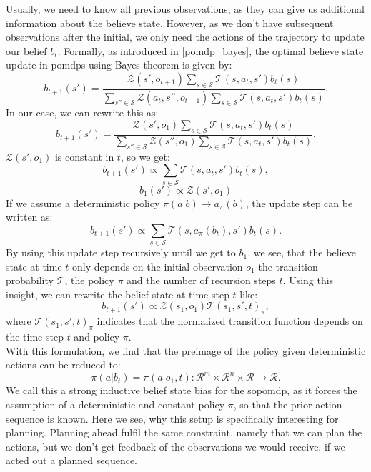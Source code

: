 Usually, 
we need to know all previous observations, as they can give us additional information about the believe state. However, as we don't have subsequent observations 
after the initial, we only need the actions of the trajectory to update our belief $b_t$. Formally, as introduced in \ref{pomdp_bayes}, the optimal believe state 
update in \ac{pomdp}s using Bayes theorem is given by:
\begin{equation}
    b_{t+1}(s') = \frac{\mathcal{Z}(s', o_{t+1}) \sum_{s \in \mathcal{S}} \mathcal{T}(s, a_t, s') b_t(s)}{\sum_{s'' \in \mathcal{S}} \mathcal{Z}(a_t, s'', o_{t+1}) \sum_{s \in \mathcal{S}} \mathcal{T}(s, a_t, s') b_t(s)}.
\end{equation}
In our case, we can rewrite this as:
\begin{equation}
    b_{t+1}(s') = \frac{\mathcal{Z}(s', o_{1}) \sum_{s \in \mathcal{S}} \mathcal{T}(s, a_t, s') b_t(s)}{\sum_{s'' \in \mathcal{S}} \mathcal{Z}(s'', o_{1}) \sum_{s \in \mathcal{S}} \mathcal{T}(s, a_t, s') b_t(s)}.
\end{equation}
$\mathcal{Z}(s', o_{1})$ is constant in $t$, so we get:
\begin{equation*}
    b_{t+1}(s') \propto \sum_{s \in \mathcal{S}} \mathcal{T}(s, a_t, s') b_t(s),
\end{equation*}
\begin{equation}
    b_{1}(s') \propto \mathcal{Z}(s', o_{1})
\end{equation}
If we assume a deterministic policy $\pi(a|b) \rightarrow a_{\pi}(b)$, the update step can be written as:
\begin{equation}
    b_{t+1}(s') \propto \sum_{s \in \mathcal{S}} \mathcal{T}(s, a_{\pi}(b_t), s') b_t(s).
\end{equation}
By using this update step recursively until we get to $b_{1}$, we see, that the believe state at time $t$ only depends on the initial observation $o_1$
the transition probability $\mathcal{T}$, the policy $\pi$ and the number of recursion steps $t$. Using this insight, we can rewrite the belief state at time step $t$ like:
\begin{equation}
    b_{t+1}(s') \propto \mathcal{Z}(s_1, o_{1}) \mathcal{T}(s_1, s', t)_{\pi},
\end{equation}
where $\mathcal{T}(s_1, s', t)_{\pi}$ indicates that the normalized transition function depends on the time step $t$ and policy $\pi$.\\
With this formulation, we find that the preimage of the policy given deterministic actions can be reduced to:
$$\pi(a|b_t) = \pi(a|o_1, t): \mathcal{R}^m \times \mathcal{R}^{n} \times \mathcal{R} \rightarrow \mathcal{R}.$$
We call this a strong inductive belief state bias for the \ac{sopomdp}, as it forces the assumption of a deterministic and constant policy $\pi$, so that the prior action sequence is known. 
Here we see, 
why this setup is specifically interesting for planning. Planning ahead fulfil the same constraint, namely that we can plan the actions, but we don't get feedback of the 
observations we would receive, if we acted out a planned sequence. \\


